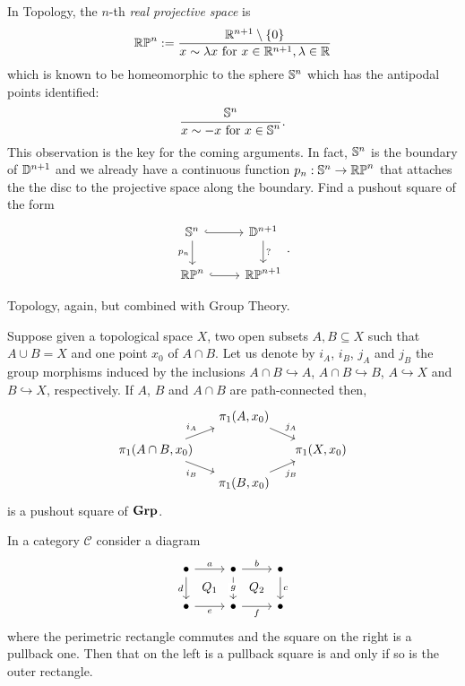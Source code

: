\begin{exercise}
  In Topology, the \(n\)-th {\em real projective space} is
  \[\mathbb{RP}^n := \frac{\mathbb R^{n+1} \setminus \left\{0\right\}}{x \sim \lambda x
      \text{ for } x \in \mathbb R^{n+1}, \lambda \in \mathbb R}\] which is
  known to be homeomorphic to the sphere \(\mathbb S^n\) which has the
  antipodal points identified:
  \[\frac{\mathbb S^n}{\displaystyle x \sim - x \text{ for } x \in \mathbb S^n}
    .\] This observation is the key for the coming arguments. In fact,
  \(\mathbb S^n\) is the boundary of \(\mathbb D^{n+1}\) and we already have a
  continuous function \(p_n : \mathbb S^n \to \mathbb{RP}^n\) that attaches the
  the disc to the projective space along the boundary. Find a pushout
  square of the form
  \[\begin{tikzcd}
      \sph^n \ar[hookrightarrow, r] \ar["p_n", d, swap] & \dsc^{n+1} \ar["?", d] \\
      \rpspc^n \ar[r, hookrightarrow] & \rpspc^{n+1}
    \end{tikzcd}.\]
\end{exercise}

Topology, again, but combined with Group Theory.

\begin{example}
  Suppose given a topological space \(X\), two open subsets
  \(A, B \subseteq X\) such that \(A \cup B = X\) and one point \(x_0\)
  of \(A \cap B\). Let us denote by \(i_A\), \(i_B\), \(j_A\) and
  \(j_B\) the group morphisms induced by the inclusions
  \(A \cap B \hookrightarrow A\), \(A \cap B \hookrightarrow B\),
  \(A \hookrightarrow X\) and \(B \hookrightarrow X\), respectively. If
  \(A\), \(B\) and \(A \cap B\) are path-connected then,
  \[\begin{tikzcd}[sep=small]
      & \pi_1(A, x_0) \ar["{j_A}", dr] & \\
      \pi_1(A \cap B, x_0) \ar["{i_A}", ur] \ar["{i_B}", dr, swap] & & \pi_1(X, x_0) \\
      & \pi_1(B, x_0) \ar["{j_B}", ur, swap]
    \end{tikzcd}\] is a pushout square of \(\mathbf{Grp}\).
\end{example}


\begin{proposition}
  In a category \(\mathcal{C}\) consider a diagram
  \[\begin{tikzcd}
      \bullet \ar["a", r] \ar["d", d, swap] \ar["{Q_1}", dr, phantom] & \bullet \ar["b", r] \ar["g" description, d] \ar["{Q_2}", dr, phantom] & \bullet \ar["c", d]\\
      \bullet \ar["e", r, swap] & \bullet \ar["f", r, swap] & \bullet
    \end{tikzcd}\] where the perimetric rectangle commutes and the
  square on the right is a pullback one. Then that on the left is a
  pullback square is and only if so is the outer rectangle.
\end{proposition}

